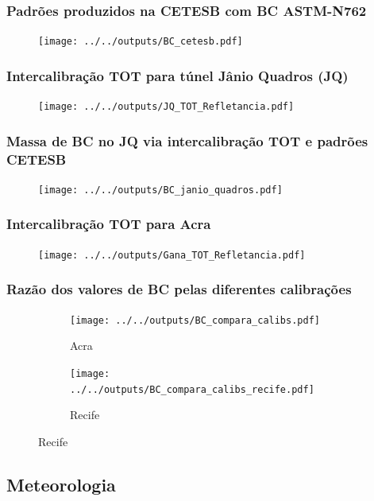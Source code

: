 \begin{frame}
  \frametitle{Padrões produzidos na CETESB com BC ASTM-N762}
  \begin{figure}[H]
  	\centering
  	\texttt{[image: ../../outputs/BC\_cetesb.pdf]}
  \end{figure}
\end{frame}

\begin{frame}
  \frametitle{Intercalibração TOT para túnel Jânio Quadros (JQ)}
  \begin{figure}[H]
    \centering
    \texttt{[image: ../../outputs/JQ\_TOT\_Refletancia.pdf]}
  \end{figure}
\end{frame}

\begin{frame}
  \frametitle{Massa de BC no JQ via intercalibração TOT e padrões CETESB}
  \begin{figure}[H]
    \centering
      \texttt{[image: ../../outputs/BC\_janio\_quadros.pdf]}
  \end{figure}
\end{frame}

\begin{frame}
  \frametitle{Intercalibração TOT para Acra}
  \begin{figure}[H]
  	\begin{center}
  		\texttt{[image: ../../outputs/Gana\_TOT\_Refletancia.pdf]}
  	\end{center}
  \end{figure}
\end{frame}

\begin{frame}
  \frametitle{Razão dos valores de BC pelas diferentes calibrações}
  \begin{figure}[H]
  	\centering
  	\begin{subfigure}[b]{0.44\linewidth}
  		\texttt{[image: ../../outputs/BC\_compara\_calibs.pdf]}
  		\caption{Acra}
  	\end{subfigure}
  		\hspace{0.3cm}
  	\begin{subfigure}[b]{0.44\linewidth}
  		\texttt{[image: ../../outputs/BC\_compara\_calibs\_recife.pdf]}
  		\caption{Recife}
  	\end{subfigure}%
   \end{figure}
\end{frame}

\subsection{Meteorologia}


